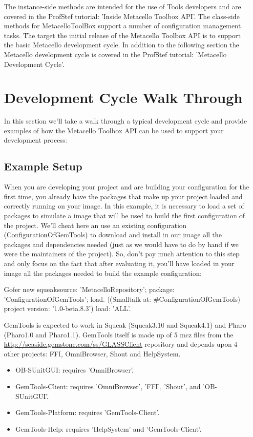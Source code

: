 \documentclass[a4paper,10pt,twoside]{book}
\begin{document}
\begin{code}{}
\begin{code}{}
The instance-side methods are intended for the use of Tools developers and are covered in the ProfStef tutorial: 'Inside Metacello Toolbox API'. The class-side methods for MetacelloToolBox support a number of configuration management tasks. The target the initial release of the Metacello Toolbox API is to support the basic Metacello development cycle. In addition to the following section the Metacello development cycle is covered in the ProfStef tutorial: 'Metacello Development Cycle'.


\section{Development Cycle Walk Through}

In this section we'll take a walk through a typical development cycle and provide examples of how the Metacello Toolbox API can be used to support your development process:

\subsection{Example Setup}

When you are developing your project and are building your configuration for the first time, you already have the packages that make up your project loaded and correctly running on your image. In this example, it is necessary to load a set of packages to simulate a image that will be used to build the first configuration of the project. We'll cheat here an use an existing configuration (ConfigurationOfGemTools) to download and install in our image all the packages and dependencies needed (just as we would have to do by hand if we were the maintainers of the project). So, don't pay much attention to this step and only focus on the fact that after evaluating it, you'll have loaded in your image all the packages needed to build the example configuration:

\begin{code}{}
Gofer new
  squeaksource: 'MetacelloRepository';
  package: 'ConfigurationOfGemTools';
  load.
((Smalltalk at: #ConfigurationOfGemTools) project version: '1.0-beta.8.3')
  load: 'ALL'.
\end{code}

GemTools is expected to work in Squeak (Squeak3.10 and Squeak4.1) and Pharo (Pharo1.0 and Pharo1.1). GemTools itself is made up of 5 mcz files from the \url{http://seaside.gemstone.com/ss/GLASSClient} repository and  depends upon 4 other projects: FFI, OmniBrowser, Shout and HelpSystem. 
\begin{itemize}
\item OB-SUnitGUI: requires 'OmniBrowser'. 
\item GemTools-Client: requires 'OmniBrowser', 'FFI', 'Shout', and 'OB-SUnitGUI'. 
\item GemTools-Platform: requires 'GemTools-Client'. 
\item GemTools-Help: requires 'HelpSystem' and 'GemTools-Client'. 
\end{itemize}



\end{code}
\end{code}
\end{document}

